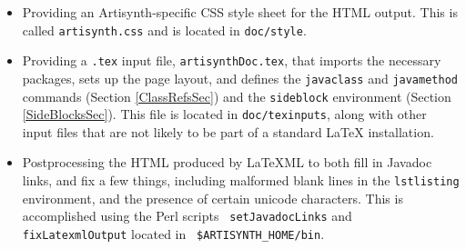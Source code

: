 \documentclass{article}
\begin{document}
\begin{itemize}

\item Providing an Artisynth-specific CSS style sheet for the HTML output.
This is called {\tt artisynth.css} and is located in {\tt doc/style}.

\item Providing a {\tt .tex} input file, {\tt artisynthDoc.tex}, that
imports the necessary packages, sets up the page layout, and defines
the {\tt \BKS javaclass} and {\tt \BKS javamethod} commands (Section
\ref{ClassRefsSec}) and the {\tt sideblock} environment (Section
\ref{SideBlocksSec}).  This file is located in {\tt doc/texinputs},
along with other input files that are not likely to be part of a
standard LaTeX installation.

\item Postprocessing the HTML produced by LaTeXML to both fill in
Javadoc links, and fix a few things, including malformed blank lines
in the {\tt lstlisting} environment, and the presence of certain
unicode characters.  This is accomplished using the Perl scripts {\tt
setJavadocLinks} and {\tt fixLatexmlOutput} located in {\tt
\$ARTISYNTH\_HOME/bin}.

\end{itemize}
\end{document}
